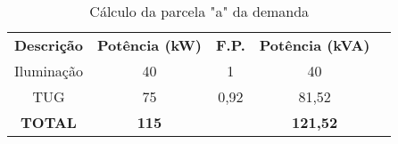 \begin{table}[H]
\centering
\caption{Cálculo da parcela "a" da demanda}
\begin{tabular}{|c|c|c|c|l}
\cline{1-4}
\textbf{Descrição} & \textbf{Potência (kW)} & \textbf{F.P.} & \textbf{Potência (kVA)} &  \\ \cline{1-4}
Iluminação         & 40                     & 1             & 40                      &  \\ \cline{1-4}
TUG                & 75                     & 0,92          & 81,52                    &  \\ \cline{1-4}
\textbf{TOTAL}     & \textbf{115}           & \textbf{}     & \textbf{121,52}          &  \\ \cline{1-4}
\end{tabular}
\end{table}